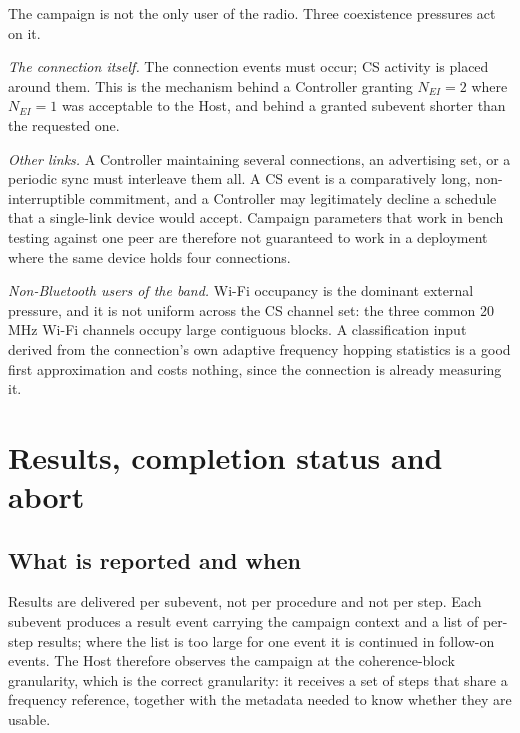 \documentclass[11pt,a4paper]{article}
\newcommand{\Nei}{N_{EI}}
\begin{document}
The campaign is not the only user of the radio. Three coexistence pressures act on it.

\emph{The connection itself.} The connection events must occur; CS activity is placed around them.
This is the mechanism behind a Controller granting $\Nei = 2$ where $\Nei = 1$ was acceptable to the
Host, and behind a granted subevent shorter than the requested one.

\emph{Other links.} A Controller maintaining several connections, an advertising set, or a periodic
sync must interleave them all. A CS event is a comparatively long, non-interruptible commitment, and
a Controller may legitimately decline a schedule that a single-link device would accept. Campaign
parameters that work in bench testing against one peer are therefore not guaranteed to work in a
deployment where the same device holds four connections.

\emph{Non-Bluetooth users of the band.} Wi-Fi occupancy is the dominant external pressure, and it is
not uniform across the CS channel set: the three common 20\,MHz Wi-Fi channels occupy large
contiguous blocks. A classification input derived from the connection's own adaptive frequency
hopping statistics is a good first approximation and costs nothing, since the connection is already
measuring it.

\section{Results, completion status and abort}
\label{sec:results}

\subsection{What is reported and when}

Results are delivered per subevent, not per procedure and not per step. Each subevent produces a
result event carrying the campaign context and a list of per-step results; where the list is too
large for one event it is continued in follow-on events. The Host therefore observes the campaign at
the coherence-block granularity, which is the correct granularity: it receives a set of steps that
share a frequency reference, together with the metadata needed to know whether they are usable.
\end{document}
